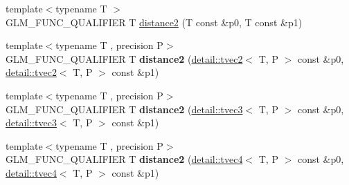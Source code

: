 \begin{DoxyCompactItemize}
\item 
{\footnotesize template$<$typename T $>$ }\\G\+L\+M\+\_\+\+F\+U\+N\+C\+\_\+\+Q\+U\+A\+L\+I\+F\+I\+ER T \hyperlink{group__gtx__norm_ga3544f6288d3bce2cf2a9f6ebe39e0557}{distance2} (T const \&p0, T const \&p1)
\item 
{\footnotesize template$<$typename T , precision P$>$ }\\G\+L\+M\+\_\+\+F\+U\+N\+C\+\_\+\+Q\+U\+A\+L\+I\+F\+I\+ER T {\bfseries distance2} (\hyperlink{structglm_1_1detail_1_1tvec2}{detail\+::tvec2}$<$ T, P $>$ const \&p0, \hyperlink{structglm_1_1detail_1_1tvec2}{detail\+::tvec2}$<$ T, P $>$ const \&p1)\hypertarget{namespaceglm_acd53e249662a44d82b8ec598866aa5b7}{}\label{namespaceglm_acd53e249662a44d82b8ec598866aa5b7}

\item 
{\footnotesize template$<$typename T , precision P$>$ }\\G\+L\+M\+\_\+\+F\+U\+N\+C\+\_\+\+Q\+U\+A\+L\+I\+F\+I\+ER T {\bfseries distance2} (\hyperlink{structglm_1_1detail_1_1tvec3}{detail\+::tvec3}$<$ T, P $>$ const \&p0, \hyperlink{structglm_1_1detail_1_1tvec3}{detail\+::tvec3}$<$ T, P $>$ const \&p1)\hypertarget{namespaceglm_a0d982b7f9df34f27a0fd101889deccf9}{}\label{namespaceglm_a0d982b7f9df34f27a0fd101889deccf9}

\item 
{\footnotesize template$<$typename T , precision P$>$ }\\G\+L\+M\+\_\+\+F\+U\+N\+C\+\_\+\+Q\+U\+A\+L\+I\+F\+I\+ER T {\bfseries distance2} (\hyperlink{structglm_1_1detail_1_1tvec4}{detail\+::tvec4}$<$ T, P $>$ const \&p0, \hyperlink{structglm_1_1detail_1_1tvec4}{detail\+::tvec4}$<$ T, P $>$ const \&p1)\hypertarget{namespaceglm_a20cbd12ccd2a5306fbdb0542c2700e67}{}\label{namespaceglm_a20cbd12ccd2a5306fbdb0542c2700e67}


\end{DoxyCompactItemize}
